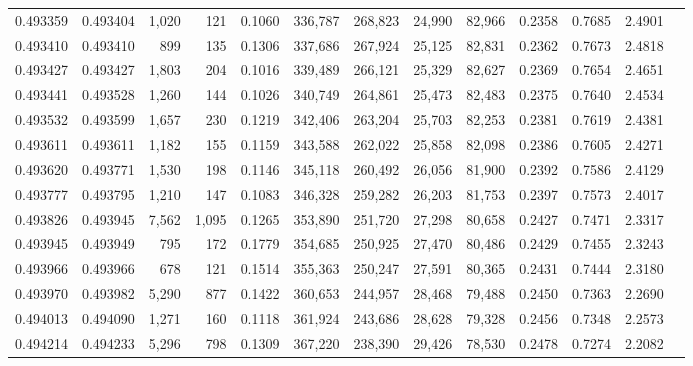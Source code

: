\begin{tabular}{rrrrrrrrrrrrr}
0.493359 & 0.493404 & 1,020 &   121 &                                     0.1060 & 336,787 & 268,823 &  24,990 &  82,966 & 0.2358 & 0.7685 & 2.4901 \\
0.493410 & 0.493410 &   899 &   135 &                                     0.1306 & 337,686 & 267,924 &  25,125 &  82,831 & 0.2362 & 0.7673 & 2.4818 \\
0.493427 & 0.493427 & 1,803 &   204 &                                     0.1016 & 339,489 & 266,121 &  25,329 &  82,627 & 0.2369 & 0.7654 & 2.4651 \\
0.493441 & 0.493528 & 1,260 &   144 &                                     0.1026 & 340,749 & 264,861 &  25,473 &  82,483 & 0.2375 & 0.7640 & 2.4534 \\
0.493532 & 0.493599 & 1,657 &   230 &                                     0.1219 & 342,406 & 263,204 &  25,703 &  82,253 & 0.2381 & 0.7619 & 2.4381 \\
0.493611 & 0.493611 & 1,182 &   155 &                                     0.1159 & 343,588 & 262,022 &  25,858 &  82,098 & 0.2386 & 0.7605 & 2.4271 \\
0.493620 & 0.493771 & 1,530 &   198 &                                     0.1146 & 345,118 & 260,492 &  26,056 &  81,900 & 0.2392 & 0.7586 & 2.4129 \\
0.493777 & 0.493795 & 1,210 &   147 &                                     0.1083 & 346,328 & 259,282 &  26,203 &  81,753 & 0.2397 & 0.7573 & 2.4017 \\
0.493826 & 0.493945 & 7,562 & 1,095 &                                     0.1265 & 353,890 & 251,720 &  27,298 &  80,658 & 0.2427 & 0.7471 & 2.3317 \\
0.493945 & 0.493949 &   795 &   172 &                                     0.1779 & 354,685 & 250,925 &  27,470 &  80,486 & 0.2429 & 0.7455 & 2.3243 \\
0.493966 & 0.493966 &   678 &   121 &                                     0.1514 & 355,363 & 250,247 &  27,591 &  80,365 & 0.2431 & 0.7444 & 2.3180 \\
0.493970 & 0.493982 & 5,290 &   877 &                                     0.1422 & 360,653 & 244,957 &  28,468 &  79,488 & 0.2450 & 0.7363 & 2.2690 \\
0.494013 & 0.494090 & 1,271 &   160 &                                     0.1118 & 361,924 & 243,686 &  28,628 &  79,328 & 0.2456 & 0.7348 & 2.2573 \\
0.494214 & 0.494233 & 5,296 &   798 &                                     0.1309 & 367,220 & 238,390 &  29,426 &  78,530 & 0.2478 & 0.7274 & 2.2082 \\

\end{tabular}
